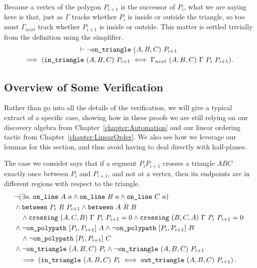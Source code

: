 Because a vertex of the polygon $P_{i+1}$ is the successor of $P_i$, what we are saying here is that, just as $\Gamma$ tracks whether $P_i$ is inside or outside the triangle, so too must $\Gamma_{next}$ track whether $P_{i+1}$ is inside or outside. This matter is settled trivially from the definition using the simplifier.
\begin{multline*}
\vdash\neg\texttt{on\_triangle}\ (A,B,C)\ P_{i+1}\\
\implies (\texttt{in\_triangle}\ (A,B,C)\ P_{i+1} \iff \Gamma_{next}\ (A,B,C)\ \Gamma\ P_i\ P_{i+1}).
\end{multline*}

\subsection{Overview of Some Verification}
Rather than go into all the details of the verification, we will give a typical extract of a specific case, showing how in these proofs we are still relying on our discovery algebra from Chapter~\ref{chapter:Automation} and our linear ordering tactic from Chapter~\ref{chapter:LinearOrder}. We also see how we leverage our lemmas for this section, and thus avoid having to deal directly with half-planes.

The case we consider says that if a segment $P_iP_{i+1}$ crosses a triangle $ABC$ exactly once between $P_i$ and $P_{i+1}$, and not at a vertex, then its endpoints are in different regions with respect to the triangle. 
\begin{multline}\label{eq:IH3}
  \begin{aligned}
    &\neg(\exists a.\; \texttt{on\_line}\ A\ a\wedge \texttt{on\_line}\ B\ a\wedge \texttt{on\_line}\ C\ a)\\
    &\wedge\texttt{between}\ P_i\ R\ P_{i+1} \wedge \texttt{between}\ A\ R\ B \\
    &\quad\wedge\texttt{crossing}\ (A,C,B)\ \Gamma\ P_i\ P_{i+1} = 0\wedge\texttt{crossing}\ (B,C,A)\ \Gamma\ P_i\ P_{i+1} = 0\\
    &\wedge\neg\texttt{on\_polypath}\ [P_i,P_{i+1}]\ A \wedge \neg\texttt{on\_polypath}\ [P_i,P_{i+1}]\ B \\
    &\quad\wedge \neg\texttt{on\_polypath}\ [P_i,P_{i+1}]\ C\\
    &\wedge\neg\texttt{on\_triangle}\ (A,B,C)\ P_i \wedge\neg\texttt{on\_triangle}\ (A,B,C)\ P_{i+1}
  \end{aligned}\\
  \implies\left(\texttt{in\_triangle}\ (A,B,C)\ P_i \iff \texttt{out\_triangle}\ (A,B,C)\ P_{i+1}\right).
\end{multline}

